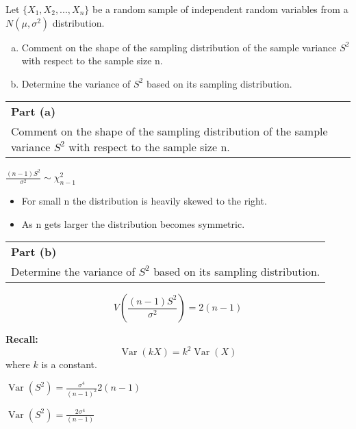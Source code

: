 \documentclass[a4paper,12pt]{article}
\begin{document}
\large
\noindent Let $\{X_1 , X_2 , ..., X_n\}$ be a random sample of independent random variables from a
$N(\mu, \sigma^2 )$ distribution.


\begin{enumerate}[(a)]
    \item %
Comment on the shape of the sampling distribution of the sample variance $S^2$
with respect to the sample size n.
\item %
 Determine the variance of $S^2$ based on its sampling distribution.
\end{enumerate}

\newpage

\begin{table}[ht!]
 \centering
 \begin{tabular}{|p{15cm}|}
 \hline  \large
\noindent \textbf{Part (a)}\\
\large
Comment on the shape of the sampling distribution of the sample variance $S^2$
with respect to the sample size n.
\smallskip
 \\ \hline
  \end{tabular}
\end{table}

$ \displaystyle{  \frac{(n-1)S^2}{\sigma^2}   \sim \chi^2_{n-1}  }$


\begin{itemize}
\item For small n the distribution is heavily skewed to the right.
\item As n gets larger the distribution becomes symmetric.
\end{itemize}
\newpage

\begin{table}[ht!]
 \centering
 \begin{tabular}{|p{15cm}|}
 \hline  \large
\noindent \textbf{Part (b)}\\\large
 Determine the variance of $S^2$ based on its sampling distribution.

\\ \hline
\end{tabular}
\end{table}




\[ \displaystyle{  V \left( \frac{(n-1)S^2}{\sigma^2}  \right) = 2(n-1) }\]

\smallskip
\begin{framed}
\noindent \textbf{Recall:}
 \[ \operatorname{Var}(k X)  = k^2 \operatorname{Var}(X) \]
where $k$ is a constant.
\end{framed}

$ \displaystyle{  \operatorname{Var} \left( S^2 \right) = \frac{\sigma^4}{(n-1)^2} 2(n-1) }$

$ \displaystyle{  \operatorname{Var} \left( S^2 \right) = \frac{2\sigma^4}{(n-1)} }$



\end{document}
